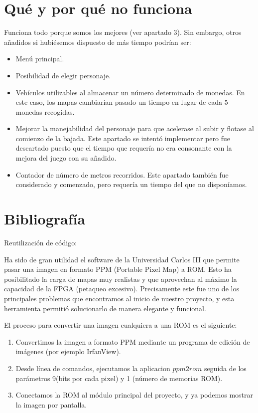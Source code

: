 \documentclass[11pt, a4paper, spanish, openright, twoside]{book}
\begin{document}
\section{Qué y por qué no funciona}
Funciona todo porque somos los mejores (ver apartado 3). Sin embargo, otros añadidos si hubiésemos dispuesto de más tiempo podrían ser:
\begin{itemize}
\item Menú principal.
\item Posibilidad de elegir personaje.
\item Vehículos utilizables al almacenar un número determinado de monedas. En este caso, los mapas cambiarían pasado un tiempo en lugar de cada 5 monedas recogidas.
\item Mejorar la  manejabilidad del personaje para que acelerase al subir y flotase al comienzo de la bajada. Este apartado se intentó implementar pero fue descartado puesto que el tiempo que requería no era consonante con la mejora del juego con su añadido.
\item Contador de número de metros recorridos. Este apartado también fue considerado y comenzado, pero requería un tiempo del que no disponíamos.
\end{itemize}


\section{Bibliografía}
Reutilización de código:

Ha sido de gran utilidad el software de la Universidad Carlos III que permite pasar una imagen en formato PPM (Portable Pixel Map) a ROM. Esto ha posibilitado la carga de mapas muy realistas y que aprovechan al máximo la capacidad de la FPGA (petaqueo excesivo).
Precisamente este fue uno de los principales problemas que encontramos al inicio de nuestro proyecto, y esta herramienta permitió solucionarlo de manera elegante y funcional. 

El proceso para convertir una imagen cualquiera a una ROM es el siguiente:
\begin{enumerate}
\item Convertimos la imagen a formato PPM mediante un programa de edición de imágenes (por ejemplo IrfanView).
\item Desde línea de comandos, ejecutamos la aplicacion $ppm2rom$ seguida de los parámetros 9(bits por cada pixel) y 1 (número de memorias ROM).
\item Conectamos la ROM al módulo principal del proyecto, y ya podemos mostrar la imagen por pantalla.
\end{enumerate}
\end{document}

